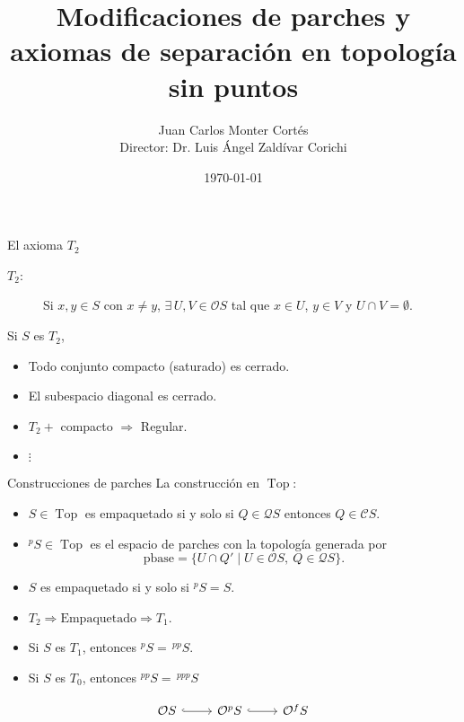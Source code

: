 \documentclass[compress,12pt]{beamer}
\title{Modificaciones de parches y axiomas de separación en topología sin puntos}
\date{\today}
\author{Juan Carlos Monter Cortés \\ Director: Dr. Luis Ángel Zaldívar Corichi}
\institute{Universidad de Guadalajara}
\DeclareMathOperator{\Top}{Top}
\begin{document}
\frame[plain]{\titlepage}


\begin{frame}{El axioma $T_2$}
\begin{description}
    \item[$T_2$:] Si $x, y\in S$ con $x\neq y$, $\exists\, U, V\in \mathcal{O}S$ tal que $x\in U$, $y\in V$ y $U\cap V=\emptyset$.
\end{description}

Si $S$ es $T_2$,

\begin{itemize}
    \item Todo conjunto compacto (saturado) es cerrado.
    \item El subespacio diagonal es cerrado.
    \item $T_2+$ compacto $\Rightarrow$ Regular.
    \item $\vdots$
\end{itemize}    
\end{frame}

\begin{frame}[fragile]{Construcciones de parches}
La construcción en $\Top$:
\begin{itemize}
    \item $S\in \Top$ es empaquetado si y solo si $Q\in \mathcal{Q}S$ entonces $Q\in \mathcal{C}S$. 
    \item $^pS\in \Top$ es el espacio de parches con la topología generada por 
    \[
    \mbox{pbase} = \{U\cap Q'\mid U\in \mathcal{O}S,\ Q\in \mathcal{Q}S\}.
    \]
    \item $S$ es empaquetado si y solo si $^pS = S$.
    \item $T_2 \Rightarrow \mbox{Empaquetado} \Rightarrow T_1$.
    \item Si $S$ es $T_1$, entonces $^pS = \,^{pp}S$.
    \item Si $S$ es $T_0$, entonces $^{pp}S = \,^{ppp}S$
\end{itemize}
\[
\begin{tikzcd}
	{\mathcal{O}S} & {\mathcal{O}^pS} & {\mathcal{O}^fS}
	\arrow[hook, from=1-1, to=1-2]
	\arrow[hook, from=1-2, to=1-3]
\end{tikzcd}
\]
\end{frame}
\end{document}
